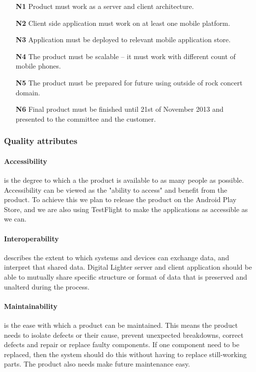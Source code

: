 \begin{enumerate}
\item[\textbf{N1}] \label{req_N1} Product must work as a server and client architecture.
\item[\textbf{N2}] \label{req_N2} Client side application must work on at least one mobile platform.
\item[\textbf{N3}] \label{req_N3} Application must be deployed to relevant mobile application store.
\item[\textbf{N4}] \label{req_N4} The product must be scalable -- it must work with different count of mobile phones.
\item[\textbf{N5}] \label{req_N5} The product must be prepared for future using outside of rock concert domain.
\item[\textbf{N6}] \label{req_N6} Final product must be finished until 21st of November 2013 and presented to the committee and the customer.
\end{enumerate}

\subsubsection{Quality attributes}
\label{sec:quality_attributes}

\paragraph{Accessibility}
is the degree to which a the product is available to as many people as possible. 
Accessibility can be viewed as the "ability to access" and benefit from the product. 
To achieve this we plan to release the product on the Android Play Store, and we are also using TestFlight to make the applications as accessible as we can.

\paragraph{Interoperability}
describes the extent to which systems and devices can exchange data, and interpret that shared data. Digital Lighter server and client application should be able to mutually share specific structure or format of data that is preserved and unalterd during the process.  

\paragraph{Maintainability}
is the ease with which a product can be maintained. This means the product needs to isolate defects or their cause, prevent unexpected breakdowns, correct defects and repair or replace faulty components. If one component need to be replaced, then the system should do this without having to replace still-working parts. The product also needs make future maintenance easy.

